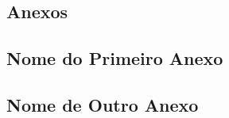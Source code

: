 
\begin{anexosenv}
    \renewcommand{\partanexos}{\part*{Anexos}}
    \partanexos

    \chapter{Nome do Primeiro Anexo}
    \lipsum[30] %

    \chapter{Nome de Outro Anexo}

    \lipsum[32] %
\end{anexosenv}